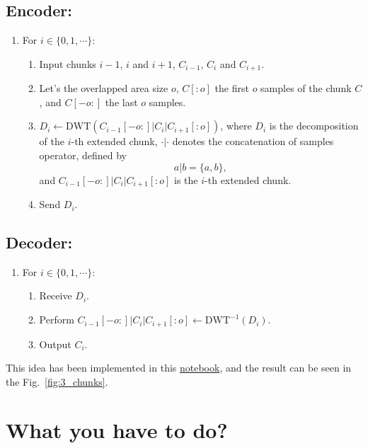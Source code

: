 \subsection*{Encoder:}
\begin{enumerate}
\item For $i\in\{0,1,\cdots\}$:   
  \begin{enumerate}               
  \item Input chunks $i-1$, $i$ and $i+1$, $C_{i-1}$, $C_i$ and $C_{i+1}$.
  \item Let's the overlapped area size $o$, $C[:o]$ the first $o$
    samples of the chunk $C$, and $C[-o:]$ the last $o$ samples.
  \item $D_i \leftarrow \text{DWT}(C_{i-1}[-o:]|C_i|C_{i+1}[:o])$, where $D_i$ is the
    decomposition of the $i$-th extended chunk, $\cdot|\cdot$ denotes
    the concatenation of samples operator, defined by
    \begin{equation}
      a|b = \{a,b\},
    \end{equation}
    and $C_{i-1}[-o:]|C_i|C_{i+1}[:o]$ is the $i$-th extended chunk.
  \item Send $D_i$.
  \end{enumerate}
\end{enumerate}

\subsection*{Decoder:}
\begin{enumerate}
\item For $i\in\{0,1,\cdots\}$:
  \begin{enumerate}
  \item Receive $D_i$.
  \item Perform $C_{i-1}[-o:]|C_i|C_{i+1}[:o]\leftarrow\text{DWT}^{-1}(D_i)$.
  \item Output $C_i$.
  \end{enumerate}
\end{enumerate}

This idea has been implemented in this
\href{https://github.com/Tecnologias-multimedia/intercom/blob/master/docs/overlapped_DWT_I.ipynb}{notebook},
and the result can be seen in the Fig.~\ref{fig:3_chunks}.

\section{What you have to do?}

